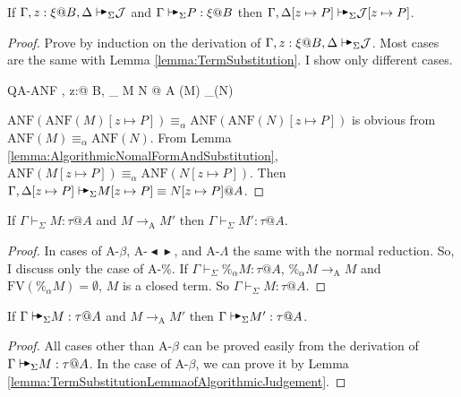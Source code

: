 \documentclass[9pt, a4paper]{extarticle}
\theoremstyle{break}
\newcommand{\G}{\Gamma}
\newcommand{\D}{\Delta}
\newcommand{\V}{\vdash_\Sigma}
\newcommand{\TB}{{\mathop{\blacktriangleright}}}
\newcommand{\TBL}{{\mathop{\blacktriangleleft}}}
\newcommand{\E}{\equiv}
\newcommand{\RA}{\longrightarrow_{\text{A}}}
\newcommand{\AV}{\vdash\!\!\!\raisebox{0.4ex}{\scalebox{0.7}{$\TB$}}}
\newcommand{\AVS}{\AV_\Sigma\xspace}
\newcommand{\ANF}{\text{ANF}}
\begin{document}
\begin{lemma}
    \label{lemma:TermSubstitutionLemmaofAlgorithmicJudgement}
    If $\G, z:\xi@B, \D \AVS \mathcal{J}$ and $\G\AVS P:\xi @B$ then $\G, \D[z \mapsto P] \AVS \mathcal{J}[z \mapsto P]$.
\end{lemma}

\begin{proof}
    Prove by induction on the derivation of \( \G, z:\xi@B, \D \AVS \mathcal{J}
    \). Most cases are the same with Lemma \ref{lemma:TermSubstitution}. I show
    only different cases.

    \begin{rneqncase}{\textsc{QA-ANF}}{
            \G, z:\xi @ B, \D \AVS M \E N @ A
            \ANF(M) \E_\alpha \ANF(N)
        }
    \end{rneqncase}
    \( \ANF(\ANF(M)[z \mapsto P]) \E_\alpha \ANF(\ANF(N)[z \mapsto P]) \) is obvious from \( \ANF(M) \E_\alpha \ANF(N) \).
    From Lemma \ref{lemma:AlgorithmicNomalFormAndSubstitution}, \( \ANF(M[z \mapsto P]) \E_\alpha \ANF(N[z \mapsto P]) \).
    Then \( \G, \D[z \mapsto P] \AVS M[z \mapsto P] \E N[z \mapsto P] @ A \).
\end{proof}

\begin{lemma}
    \label{lemma:TypePreservationofAlgorithmicReduction}
    If \( \G \V M:\tau @A \) and \( M \RA M' \) then \( \G \V M' : \tau @ A \).
\end{lemma}

\begin{proof}
    In cases of \textsc{A-$\beta$}, \textsc{A-$\TBL\TB$}, and \textsc{A-$\Lambda$} the same with the normal reduction. So, I discuss only the case of \textsc{A-\%}.
    If \( \G \V \%_\alpha M : \tau @ A \), \( \%_\alpha M \RA M \) and \( \text{FV}(\%_\alpha M) = \emptyset \), \( M \) is a closed term. So \( \G \V M : \tau @ A \).
\end{proof}

\begin{lemma}
    \label{lemma:AlgorithmicTypePreservationofAlgorithmicReduction}
    If \( \G \AVS M:\tau @A \) and \( M \RA M' \) then \( \G \AVS M' : \tau @ A \).
\end{lemma}

\begin{proof}
    All cases other than \textsc{A-$\beta$} can be proved easily from the derivation of \( \G \AVS M:\tau @A \). In the case of \textsc{A-$\beta$}, we can prove it by Lemma \ref{lemma:TermSubstitutionLemmaofAlgorithmicJudgement}.
\end{proof}
\end{document}
